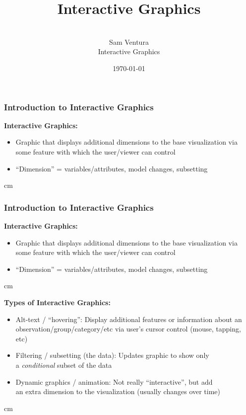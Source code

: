 \documentclass{beamer} %
\begin{document}
\title[dedup]{Interactive Graphics}


\author[Samuel L. Ventura]{\\
  \large{Sam Ventura\\Interactive Graphics}}
\date{\today}


\begin{frame}
	\maketitle

	
\end{frame}




\begin{frame}\frametitle{Introduction to Interactive Graphics}
	\small
	
	\textbf{Interactive Graphics:}
	\begin{itemize}
		\item Graphic that displays additional dimensions to the base visualization via some feature with which the user/viewer can control
		\item ``Dimension'' = variables/attributes, model changes, subsetting
	\end{itemize}
	
	
	 cm
	
\end{frame}



\begin{frame}\frametitle{Introduction to Interactive Graphics}
	\small
	
	\textbf{Interactive Graphics:}
	\begin{itemize}
		\item Graphic that displays additional dimensions to the base visualization via some feature with which the user/viewer can control
		\item ``Dimension'' = variables/attributes, model changes, subsetting
	\end{itemize}
	
	 cm
	
	\textbf{Types of Interactive Graphics:}
	\begin{itemize}
		\item Alt-text / ``hovering'':  Display additional features or information about an observation/group/category/etc via user's cursor control (mouse, tapping, etc)
		\item Filtering / subsetting (the data):  Updates graphic to show only \\a \emph{conditional} subset of the data
		\item Dynamic graphics / animation:  Not really ``interactive'', but add \\an extra dimension to the visualization (usually changes over time)
	\end{itemize}
	
	 cm
	
\end{frame}
\end{document}
